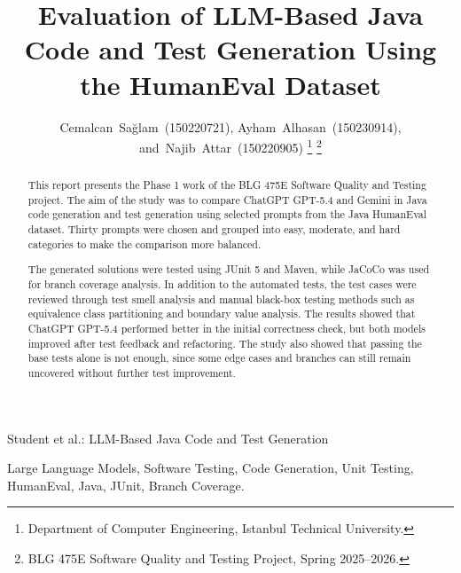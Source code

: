 \documentclass[journal]{IEEEtran}
\begin{document}
\title{Evaluation of LLM-Based Java Code and Test Generation Using the HumanEval Dataset}

\author{
Cemalcan~Sağlam~(150220721), 
Ayham~Alhasan~(150230914), 
and~Najib~Attar~(150220905)%
\thanks{Department of Computer Engineering, Istanbul Technical University.}
\thanks{BLG 475E Software Quality and Testing Project, Spring 2025--2026.}
}

%
{Student et al.: LLM-Based Java Code and Test Generation}

\maketitle

\begin{abstract}
This report presents the Phase 1 work of the BLG 475E Software Quality and Testing project. The aim of the study was to compare ChatGPT GPT-5.4 and Gemini in Java code generation and test generation using selected prompts from the Java HumanEval dataset. Thirty prompts were chosen and grouped into easy, moderate, and hard categories to make the comparison more balanced.

The generated solutions were tested using JUnit 5 and Maven, while JaCoCo was used for branch coverage analysis. In addition to the automated tests, the test cases were reviewed through test smell analysis and manual black-box testing methods such as equivalence class partitioning and boundary value analysis. The results showed that ChatGPT GPT-5.4 performed better in the initial correctness check, but both models improved after test feedback and refactoring. The study also showed that passing the base tests alone is not enough, since some edge cases and branches can still remain uncovered without further test improvement.
\end{abstract}

\begin{IEEEkeywords}
Large Language Models, Software Testing, Code Generation, Unit Testing, HumanEval, Java, JUnit, Branch Coverage.
\end{IEEEkeywords}

\end{document}
